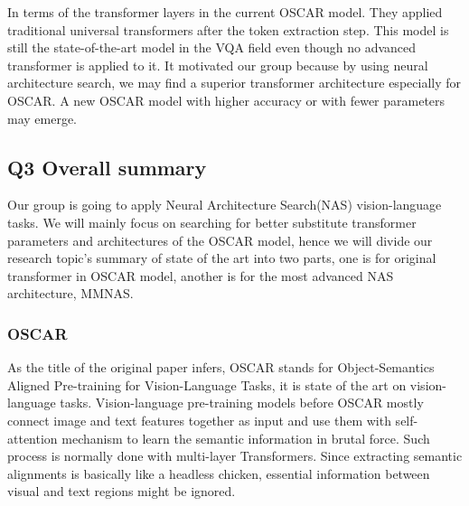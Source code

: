 \documentclass[12pt, a4paper]{article}
\begin{document}
\par\noindent \newline In terms of the transformer layers in the current OSCAR \cite{DBLP:journals/corr/abs-2004-06165} model. They applied traditional universal transformers \cite{DBLP:journals/corr/VaswaniSPUJGKP17} after the token extraction step. This model is still the state-of-the-art model in the VQA field even though no advanced transformer is applied to it. It motivated our group because by using neural architecture search, we may find a superior transformer architecture especially for OSCAR. A new OSCAR model with higher accuracy or with fewer parameters may emerge.


\subsection*{Q3 Overall summary}
\par\noindent Our group is going to apply Neural Architecture Search(NAS) vision-language tasks. We will mainly focus on searching for better substitute transformer parameters and architectures of the OSCAR \cite{DBLP:journals/corr/abs-2004-06165} model, hence we will divide our research topic's summary of state of the art into 
two parts, one is for original transformer in OSCAR \cite{DBLP:journals/corr/abs-2004-06165} model, another is for the most advanced NAS 
architecture, MMNAS.

\subsubsection*{OSCAR}

\par\noindent As the title of the original paper infers, OSCAR \cite{DBLP:journals/corr/abs-2004-06165} stands for Object-Semantics Aligned Pre-training for Vision-Language Tasks, it is state of the art on vision-language tasks. Vision-language pre-training models before OSCAR \cite{DBLP:journals/corr/abs-2004-06165} mostly connect image and text features together as input and use them with self-attention mechanism to learn the semantic information in brutal force. Such process is normally done with multi-layer Transformers. Since extracting semantic alignments is basically like a headless chicken, essential information between visual and text regions might be ignored.
\end{document}
